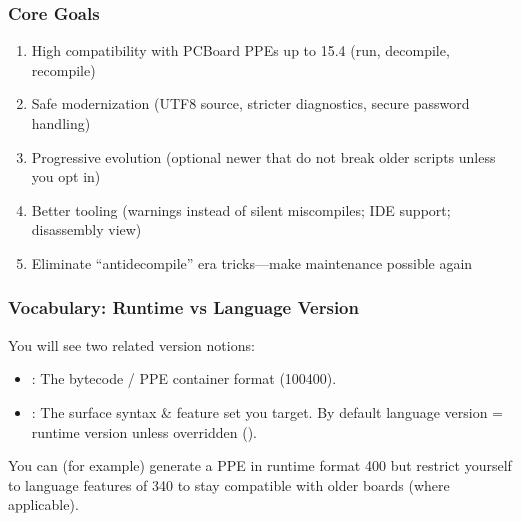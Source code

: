 \documentclass[letterpaper,10pt,english]{sphinxmanual}
\begin{document}
\subsubsection{Core Goals}
\label{\detokenize{ppl:core-goals}}\begin{enumerate}
%
\item {} 
\sphinxAtStartPar
High compatibility with PCBoard PPEs up to 15.4 (run, decompile, recompile)

\item {} 
\sphinxAtStartPar
Safe modernization (UTF\sphinxhyphen{}8 source, stricter diagnostics, secure password handling)

\item {} 
\sphinxAtStartPar
Progressive evolution (optional newer  that do not break older scripts unless you opt in)

\item {} 
\sphinxAtStartPar
Better tooling (warnings instead of silent miscompiles; IDE support; disassembly view)

\item {} 
\sphinxAtStartPar
Eliminate “anti\sphinxhyphen{}decompile” era tricks—make maintenance possible again

\end{enumerate}


\subsubsection{Vocabulary: Runtime vs Language Version}
\label{\detokenize{ppl:vocabulary-runtime-vs-language-version}}
\sphinxAtStartPar
You will see two related version notions:
\begin{itemize}
\item {} 
\sphinxAtStartPar
{}: The bytecode / PPE container format (100\sphinxhyphen{}400).

\item {} 
\sphinxAtStartPar
{}: The surface syntax \& feature set you target.
By default language version = runtime version unless overridden ().

\end{itemize}

\sphinxAtStartPar
You can (for example) generate a PPE in runtime format 400 but restrict yourself
to language features of 340 to stay compatible with older boards (where applicable).
\end{document}
